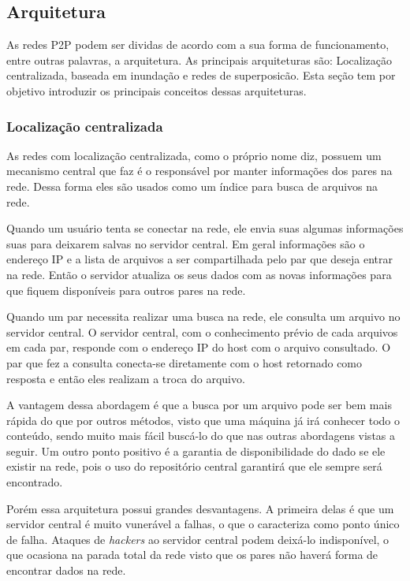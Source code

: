 \subsection{Arquitetura}

As redes P2P podem ser dividas de acordo com a sua forma de funcionamento, entre outras palavras, a arquitetura. As principais arquiteturas são: Localização centralizada, baseada em inundação e redes de superposicão. Esta seção tem por objetivo introduzir os principais conceitos dessas arquiteturas.

\subsubsection{Localização centralizada}

As redes com localização centralizada, como o próprio nome diz, possuem um mecanismo central que faz é o responsável por manter informações dos pares na rede. Dessa forma eles são usados como um índice para busca de arquivos na rede.

Quando um usuário tenta se conectar na rede, ele envia suas algumas informações suas para deixarem salvas no servidor central. Em geral informações são o endereço IP e a lista de arquivos a ser compartilhada pelo par que deseja entrar na rede. Então o servidor atualiza os seus dados com as novas informações para que fiquem disponíveis para outros pares na rede.

Quando um par necessita realizar uma busca na rede, ele consulta um arquivo no servidor central. O servidor central, com o conhecimento prévio de cada arquivos em cada par, responde com o endereço IP do host com o arquivo consultado. O par que fez a consulta conecta-se diretamente com o host retornado como resposta e então eles realizam a troca do arquivo.

A vantagem dessa abordagem é que a busca por um arquivo pode ser bem mais rápida do que por outros métodos, visto que uma máquina já irá conhecer todo o conteúdo, sendo muito mais fácil buscá-lo do que nas outras abordagens vistas a seguir. Um outro ponto positivo é a garantia de disponibilidade do dado se ele existir na rede, pois o uso do repositório central garantirá que ele sempre será encontrado.

Porém essa arquitetura possui grandes desvantagens. A primeira delas é que um servidor central é muito vunerável a falhas, o que o caracteriza como ponto único de falha. Ataques de \emph{hackers} ao servidor central podem deixá-lo indisponível, o que ocasiona na parada total da rede visto que os pares não haverá forma de encontrar dados na rede.

